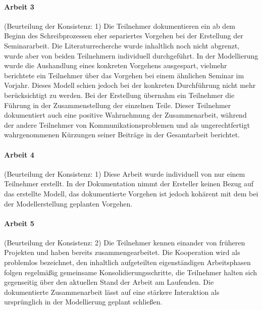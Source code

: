 
\paragraph{Arbeit 3} %
\label{par:arbeit_3}

(Beurteilung der Konsistenz: 1) Die Teilnehmer dokumentieren ein ab dem Beginn des Schreibprozessen eher separiertes Vorgehen bei der Erstellung der Seminararbeit. Die Literaturrecherche wurde inhaltlich noch nicht abgrenzt, wurde aber von beiden Teilnehmern individuell durchgeführt. In der Modellierung wurde die Aushandlung eines konkreten Vorgehens ausgespart, vielmehr berichtete ein Teilnehmer über das Vorgehen bei einem ähnlichen Seminar im Vorjahr. Dieses Modell schien jedoch bei der konkreten Durchführung nicht mehr berücksichtigt zu werden. Bei der Erstellung übernahm ein Teilnehmer die Führung in der Zusammenstellung der einzelnen Teile. Dieser Teilnehmer dokumentiert auch eine positive Wahrnehmung der Zusammenarbeit, während der andere Teilnehmer von Kommunikationsproblemen und als ungerechtfertigt wahrgenommenen Kürzungen seiner Beiträge in der Gesamtarbeit berichtet. 

\paragraph{Arbeit 4} %
\label{par:arbeit_4}

(Beurteilung der Konsistenz: 1) Diese Arbeit wurde individuell von nur einem Teilnehmer erstellt. In der Dokumentation nimmt der Ersteller keinen Bezug auf das erstellte Modell, das dokumentierte Vorgehen ist jedoch kohärent mit dem bei der Modellerstellung geplanten Vorgehen.

\paragraph{Arbeit 5} %
\label{par:arbeit_5}

(Beurteilung der Konsistenz: 2) Die Teilnehmer kennen einander von früheren Projekten und haben bereits zusammengearbeitet. Die Kooperation wird als problemlos bezeichnet, den inhaltlich aufgeteilten eigenständigen Arbeitsphasen folgen regelmäßig gemeinsame Konsolidierungsschritte, die Teilnehmer halten sich gegenseitig über den aktuellen Stand der Arbeit am Laufenden. Die dokumentierte Zusammenarbeit lässt auf eine stärkere Interaktion als ursprünglich in der Modellierung geplant schließen.

